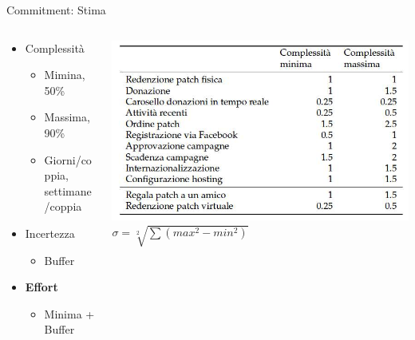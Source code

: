 \documentclass[compress, red, 14pt, pdf]{beamer}
\begin{document}
	\begin{frame}{Commitment: Stima}
		
		\begin{columns}[T]
		    \begin{column}{.5\textwidth}
		
				\begin{itemize}
					\item Complessità
					\begin{itemize}
						\item Mimina, 50\%
						\item Massima, 90\%
						\item Giorni/coppia, settimane/coppia
					\end{itemize}
					\item Incertezza
					\begin{itemize}
						\item Buffer
					\end{itemize}
				\end{itemize}

				\begin{itemize}
					\item \textbf{Effort}
					\begin{itemize}
						\item Minima + Buffer
					\end{itemize}
				\end{itemize}
		
		    \end{column}
		    \begin{column}{.5\textwidth}
				\hspace*{-0.6cm} \includegraphics[scale=0.25]{images/effort.png}
				\vspace*{0.5cm}
				\hspace*{-0.6cm} $ \sigma = \sqrt[2] { \sum \left ( max^{2} - min^{2} \right ) } $
		    \end{column}
		 \end{columns}
	
	\end{frame}
\end{document}
